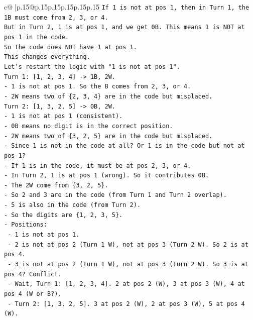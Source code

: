 \documentclass{article}
\begin{document}
{\begin{supertabular}{c@{$\;$}|p{.15\linewidth}@{}p{.15\linewidth}p{.15\linewidth}p{.15\linewidth}p{.15\linewidth}p{.15\linewidth}}
{{{\texttt{If 1 is not at pos 1, then in Turn 1, the 1B must come from 2, 3, or 4.} \\
\texttt{But in Turn 2, 1 is at pos 1, and we get 0B. This means 1 is NOT at pos 1 in the code.} \\
\texttt{So the code does NOT have 1 at pos 1.} \\
\texttt{This changes everything.} \\
\texttt{Let's restart the logic with "1 is not at pos 1".} \\
\texttt{Turn 1: {[}1, 2, 3, 4{]} {-}> 1B, 2W.} \\
\texttt{{-} 1 is not at pos 1. So the B comes from 2, 3, or 4.} \\
\texttt{{-} 2W means two of \{2, 3, 4\} are in the code but misplaced.} \\
\texttt{Turn 2: {[}1, 3, 2, 5{]} {-}> 0B, 2W.} \\
\texttt{{-} 1 is not at pos 1 (consistent).} \\
\texttt{{-} 0B means no digit is in the correct position.} \\
\texttt{{-} 2W means two of \{3, 2, 5\} are in the code but misplaced.} \\
\texttt{{-} Since 1 is not in the code at all? Or 1 is in the code but not at pos 1?} \\
\texttt{{-} If 1 is in the code, it must be at pos 2, 3, or 4.} \\
\texttt{{-} In Turn 2, 1 is at pos 1 (wrong). So it contributes 0B.} \\
\texttt{{-} The 2W come from \{3, 2, 5\}.} \\
\texttt{{-} So 2 and 3 are in the code (from Turn 1 and Turn 2 overlap).} \\
\texttt{{-} 5 is also in the code (from Turn 2).} \\
\texttt{{-} So the digits are \{1, 2, 3, 5\}.} \\
\texttt{{-} Positions:} \\
\texttt{  {-} 1 is not at pos 1.} \\
\texttt{  {-} 2 is not at pos 2 (Turn 1 W), not at pos 3 (Turn 2 W). So 2 is at pos 4.} \\
\texttt{  {-} 3 is not at pos 2 (Turn 1 W), not at pos 3 (Turn 2 W). So 3 is at pos 4? Conflict.} \\
\texttt{  {-} Wait, Turn 1: {[}1, 2, 3, 4{]}. 2 at pos 2 (W), 3 at pos 3 (W), 4 at pos 4 (W or B?).} \\
\texttt{  {-} Turn 2: {[}1, 3, 2, 5{]}. 3 at pos 2 (W), 2 at pos 3 (W), 5 at pos 4 (W).} \\
}}}
\end{supertabular}}
\end{document}
